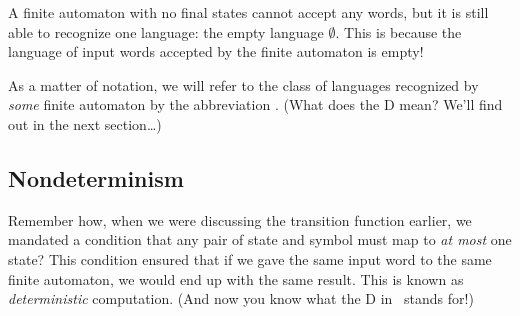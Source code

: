 \begin{example}
A finite automaton with no final states cannot accept any words, but it is still able to recognize one language: the empty language $\emptyset$. This is because the language of input words accepted by the finite automaton is empty!
\end{example}

As a matter of notation, we will refer to the class of languages recognized by \emph{some} finite automaton by the abbreviation \DFA. (What does the \textsf{D} mean? We'll find out in the next section\dots)



\subsection{Nondeterminism}

Remember how, when we were discussing the transition function earlier, we mandated a condition that any pair of state and symbol must map to \emph{at most} one state? This condition ensured that if we gave the same input word to the same finite automaton, we would end up with the same result. This is known as \emph{deterministic} computation. (And now you know what the \textsf{D} in \DFA\ stands for!)

